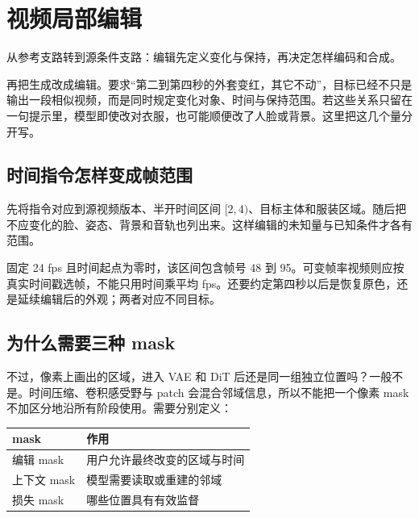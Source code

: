 \chapter{视频局部编辑}\label{seedance-m08}

从参考支路转到源条件支路：编辑先定义变化与保持，再决定怎样编码和合成。

再把生成改成编辑。要求“第二到第四秒的外套变红，其它不动”，目标已经不只是输出一段相似视频，而是同时规定变化对象、时间与保持范围。若这些关系只留在一句提示里，模型即使改对衣服，也可能顺便改了人脸或背景。这里把这几个量分开写。

\section{时间指令怎样变成帧范围}\label{seedance-m08-ux65f6ux95f4ux6307ux4ee4ux600eux6837ux53d8ux6210ux5e27ux8303ux56f4}

先将指令对应到源视频版本、半开时间区间 \([2,4)\)、目标主体和服装区域。随后把不应变化的脸、姿态、背景和音轨也列出来。这样编辑的未知量与已知条件才各有范围。

固定 24 fps 且时间起点为零时，该区间包含帧号 48 到 95。可变帧率视频则应按真实时间戳选帧，不能只用时间乘平均 fps。还要约定第四秒以后是恢复原色，还是延续编辑后的外观；两者对应不同目标。

\section{为什么需要三种 mask}\label{seedance-m08-ux4e3aux4ec0ux4e48ux9700ux8981ux4e09ux79cd-mask}

不过，像素上画出的区域，进入 VAE 和 DiT 后还是同一组独立位置吗？一般不是。时间压缩、卷积感受野与 patch 会混合邻域信息，所以不能把一个像素 mask 不加区分地沿所有阶段使用。需要分别定义：

{\def\LTcaptype{table} %
\small\setlength{\tabcolsep}{3pt}\renewcommand{\arraystretch}{1.18}
\begin{longtable}[]{@{}
  >{\raggedright\arraybackslash}p{}
  >{\raggedright\arraybackslash}p{}@{}}
\toprule\noalign{}
\begin{minipage}[b]{\linewidth}\raggedright
mask
\end{minipage} & \begin{minipage}[b]{\linewidth}\raggedright
作用
\end{minipage} \\
\midrule\noalign{}
\endhead
\bottomrule\noalign{}
\endlastfoot
编辑 mask & 用户允许最终改变的区域与时间 \\
上下文 mask & 模型需要读取或重建的邻域 \\
损失 mask & 哪些位置具有有效监督 \\
\end{longtable}
}

